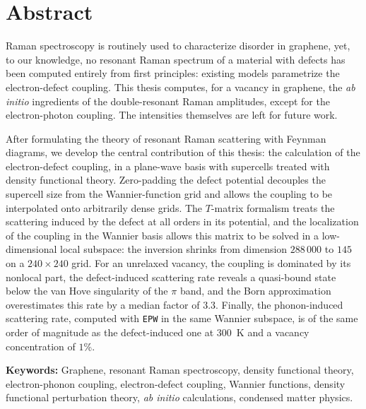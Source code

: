 \anglais
\chapter*{Abstract}

Raman spectroscopy is routinely used to characterize disorder in graphene, yet, to our knowledge, no resonant Raman spectrum of a material with defects has been computed entirely from first principles: existing models parametrize the electron-defect coupling. This thesis computes, for a vacancy in graphene, the \textit{ab initio} ingredients of the double-resonant Raman amplitudes, except for the electron-photon coupling. The intensities themselves are left for future work.

After formulating the theory of resonant Raman scattering with Feynman diagrams, we develop the central contribution of this thesis: the calculation of the electron-defect coupling, in a plane-wave basis with supercells treated with density functional theory. Zero-padding the defect potential decouples the supercell size from the Wannier-function grid and allows the coupling to be interpolated onto arbitrarily dense grids. The $T$-matrix formalism treats the scattering induced by the defect at all orders in its potential, and the localization of the coupling in the Wannier basis allows this matrix to be solved in a low-dimensional local subspace: the inversion shrinks from dimension $288\,000$ to $145$ on a $240\times 240$ grid. For an unrelaxed vacancy, the coupling is dominated by its nonlocal part, the defect-induced scattering rate reveals a quasi-bound state below the van Hove singularity of the $\pi$ band, and the Born approximation overestimates this rate by a median factor of $3.3$. Finally, the phonon-induced scattering rate, computed with \texttt{EPW} in the same Wannier subspace, is of the same order of magnitude as the defect-induced one at $300$~K and a vacancy concentration of $1$\%.

{\bf Keywords:} Graphene, resonant Raman spectroscopy, density functional theory, electron-phonon coupling, electron-defect coupling, Wannier functions, density functional perturbation theory, \textit{ab initio} calculations, condensed matter physics.